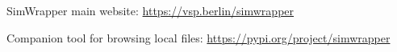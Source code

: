 \documentclass[3p,times,procedia]{elsarticle}
\begin{document}
SimWrapper main website: \url{https://vsp.berlin/simwrapper}

Companion tool for browsing local files: \url{https://pypi.org/project/simwrapper}




%


%
%


\end{document}
